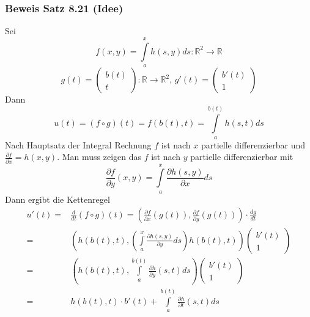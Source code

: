 \subsubsection*{Beweis Satz 8.21 (Idee)}
Sei \[f\left( {x,y} \right) = \int\limits_a^x {h\left( {s,y} \right)ds}:\mathbb{R}^2\rightarrow\mathbb{R} \]
\[g\left( t \right) = \left( {\begin{array}{*{20}{c}}
{b\left( t \right)}\\
t
\end{array}} \right):\mathbb{R}\rightarrow\mathbb{R}^2\text{, }g'\left( t \right) = \left( {\begin{array}{*{20}{c}}
{b'\left( t \right)}\\
1
\end{array}} \right)\]
Dann \[u(t) = \left( {f \circ g} \right)(t) = f\left( {b(t),t} \right) = \int\limits_a^{b(t)} {h(s,t)ds} \]
Nach Hauptsatz der Integral Rechnung $f$ ist nach $x$ partielle differenzierbar und $\frac{\partial f}{\partial x}=h(x,y)$. Man muss zeigen das $f$ ist nach $y$ partielle differenzierbar mit \[\frac{{\partial f}}{{\partial y}}(x,y) = \int\limits_a^x {\frac{{\partial h(s,y)}}{{\partial x}}ds} \]
Dann ergibt die Kettenregel
\begin{align*}
u'(t) = &\frac{d}{{dt}}\left( {f \circ g} \right)(t) = \left( {\frac{{\partial f}}{{\partial x}}\left( {g(t)} \right),\frac{{\partial f}}{{\partial y}}\left( {g(t)} \right)} \right) \cdot \frac{{dg}}{{dt}}\\
= &\left( {h\left( {b(t),t} \right),\left( {\int\limits_a^x {\frac{{\partial h(s,y)}}{{\partial y}}ds} } \right)h\left( {b(t),t} \right)} \right)\left( {\begin{array}{*{20}{c}}
{b'(t)}\\
1
\end{array}} \right)\\
= &\left( {h\left( {b(t),t} \right),\int\limits_a^{b(t)} {\frac{{\partial h}}{{\partial y}}(s,t)ds} } \right)\left( {\begin{array}{*{20}{c}}
{b'(t)}\\
1
\end{array}} \right)\\
= & h\left( {b(t),t} \right) \cdot b'(t) + \int\limits_a^{b(t)} {\frac{{\partial h}}{{\partial t}}(s,t)ds}
\end{align*}
